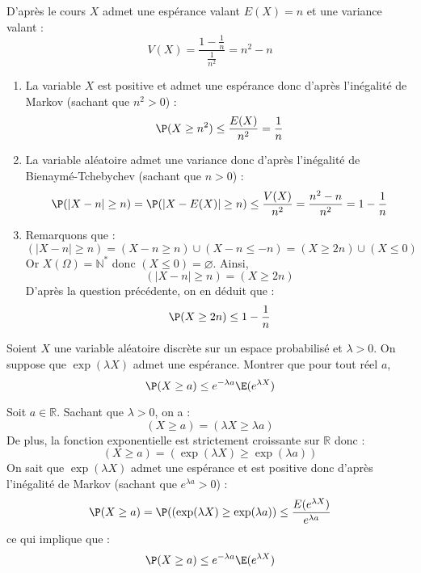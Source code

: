 \documentclass[a4paper,10pt]{report}
\begin{document}
\corr D'après le cours $X$ admet une espérance valant $E(X)=n$ et une variance valant :
$$ V(X) = \dfrac{1- \tfrac{1}{n}}{\tfrac{1}{n^2}} = n^2-n$$

\begin{enumerate}
\item La variable $X$ est positive et admet une espérance donc d'après l'inégalité de Markov (sachant que $n^2>0$) :
$$ \P(X \geq n^2) \leq \dfrac{E(X)}{n^2} = \dfrac{1}{n}$$
\item La variable aléatoire admet une variance donc d'après l'inégalité de Bienaymé-Tchebychev (sachant que $n>0$) :
$$ \P( \vert X- n \vert \geq n) =  \P( \vert X- E(X) \vert \geq n) \leq \dfrac{V(X)}{n^2} = \dfrac{n^2-n}{n^2} = 1 - \dfrac{1}{n}$$
\item Remarquons que :
$$ (\vert X- n \vert \geq n) = (X-n \geq n) \cup (X-n \leq -n) = (X \geq 2n) \cup (X \leq 0)$$
Or $X(\Omega)= \mathbb{N}^*$ donc $(X \leq 0) = \varnothing$. Ainsi,
$$ (\vert X- n \vert \geq n) = (X \geq 2n)$$
D'après la question précédente, on en déduit que :
$$\P(X \geq 2n) \leq 1 - \dfrac{1}{n} $$
\end{enumerate}

\begin{Exa} Soient $X$ une variable aléatoire discrète sur un espace probabilisé et $\lambda >0$. On suppose que $\exp(\lambda X)$ admet une espérance. Montrer que pour tout réel $a$,
$$ \P(X \geq a) \leq e^{-\lambda a} \E(e^{\lambda X})$$
\end{Exa}

\corr Soit $a \in \mathbb{R}$. Sachant que $\lambda>0$, on a :
$$ (X \geq a) = (\lambda X \geq \lambda a)$$
De plus, la fonction exponentielle est strictement croissante sur $\mathbb{R}$ donc :
$$ (X \geq a) = (\exp(\lambda X) \geq \exp(\lambda a))$$
On sait que $\exp(\lambda X)$ admet une espérance et est positive donc d'après l'inégalité de Markov (sachant que $e^{\lambda a}>0$) :
$$ \P(X \geq a) = \P((\exp(\lambda X) \geq \exp(\lambda a)) \leq \dfrac{E(e^{\lambda X})}{e^{\lambda a}}$$
ce qui implique que :
$$ \P(X \geq a) \leq e^{-\lambda a} \E(e^{\lambda X})$$
\end{document}
